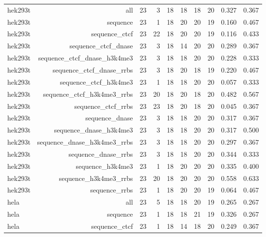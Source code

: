 \begin{table}[htbp]
{\begin{tabular}{lrrrrrrrrr}
hek293t & all & 23 & 3 & 18 & 18 & 18 & 20 & 0.327 & 0.367 \\
hek293t & sequence & 23 & 1 & 18 & 20 & 20 & 19 & 0.160 & 0.467 \\
hek293t & sequence\_ctcf & 23 & 22 & 18 & 20 & 20 & 19 & 0.116 & 0.433 \\
hek293t & sequence\_ctcf\_dnase & 23 & 3 & 18 & 14 & 20 & 20 & 0.289 & 0.367 \\
hek293t & sequence\_ctcf\_dnase\_h3k4me3 & 23 & 3 & 18 & 18 & 20 & 20 & 0.228 & 0.333 \\
hek293t & sequence\_ctcf\_dnase\_rrbs & 23 & 3 & 18 & 20 & 18 & 19 & 0.220 & 0.467 \\
hek293t & sequence\_ctcf\_h3k4me3 & 23 & 1 & 18 & 18 & 20 & 20 & 0.057 & 0.333 \\
hek293t & sequence\_ctcf\_h3k4me3\_rrbs & 23 & 20 & 18 & 20 & 18 & 20 & 0.482 & 0.567 \\
hek293t & sequence\_ctcf\_rrbs & 23 & 23 & 18 & 20 & 18 & 20 & 0.045 & 0.367 \\
hek293t & sequence\_dnase & 23 & 3 & 18 & 18 & 20 & 20 & 0.317 & 0.367 \\
hek293t & sequence\_dnase\_h3k4me3 & 23 & 3 & 18 & 18 & 20 & 20 & 0.317 & 0.500 \\
hek293t & sequence\_dnase\_h3k4me3\_rrbs & 23 & 3 & 18 & 18 & 20 & 20 & 0.297 & 0.367 \\
hek293t & sequence\_dnase\_rrbs & 23 & 3 & 18 & 18 & 20 & 20 & 0.344 & 0.333 \\
hek293t & sequence\_h3k4me3 & 23 & 1 & 18 & 20 & 20 & 20 & 0.335 & 0.400 \\
hek293t & sequence\_h3k4me3\_rrbs & 23 & 20 & 18 & 20 & 20 & 20 & 0.558 & 0.633 \\
hek293t & sequence\_rrbs & 23 & 1 & 18 & 20 & 20 & 19 & 0.064 & 0.467 \\
hela & all & 23 & 5 & 18 & 18 & 20 & 19 & 0.265 & 0.267 \\
hela & sequence & 23 & 1 & 18 & 18 & 21 & 19 & 0.326 & 0.267 \\
hela & sequence\_ctcf & 23 & 1 & 18 & 14 & 18 & 20 & 0.249 & 0.367 \\
\bottomrule
\end{tabular}
}
\end{table}

